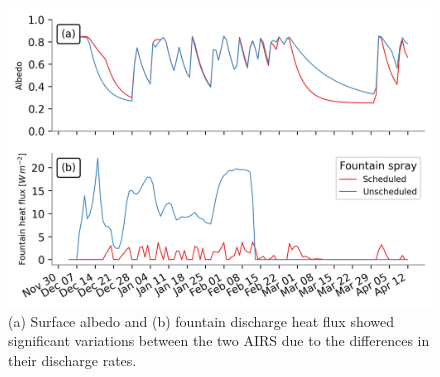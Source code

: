 \documentclass[tc, manuscript]{copernicus}
\begin{document}
\begin{figure}[t]
\includegraphics[width=12cm]{Figures/dis_processes.png}
\caption{(a) Surface albedo  and (b) fountain discharge heat flux showed significant variations between the two
  AIRS due to the differences in their discharge rates.}
\label{fig:dis_processes}
\end{figure}
\end{document}
